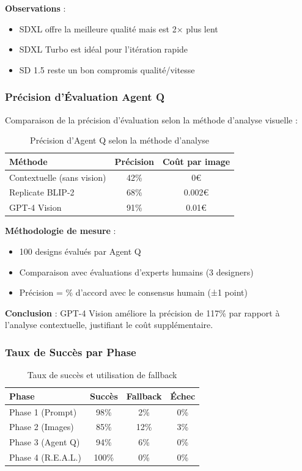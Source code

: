 \textbf{Observations} :
\begin{itemize}[leftmargin=*]
    \item SDXL offre la meilleure qualité mais est 2× plus lent
    \item SDXL Turbo est idéal pour l'itération rapide
    \item SD 1.5 reste un bon compromis qualité/vitesse
\end{itemize}

\subsubsection{Précision d'Évaluation Agent Q}

Comparaison de la précision d'évaluation selon la méthode d'analyse visuelle :

\begin{table}[H]
\centering
\caption{Précision d'Agent Q selon la méthode d'analyse}
\label{tab:agent_q_accuracy}
\begin{tabular}{@{}lcc@{}}
\toprule
\textbf{Méthode} & \textbf{Précision} & \textbf{Coût par image} \\ 
\midrule
Contextuelle (sans vision) & 42\% & 0€ \\
Replicate BLIP-2 & 68\% & 0.002€ \\
GPT-4 Vision & 91\% & 0.01€ \\
\bottomrule
\end{tabular}
\end{table}

\textbf{Méthodologie de mesure} :
\begin{itemize}[leftmargin=*]
    \item 100 designs évalués par Agent Q
    \item Comparaison avec évaluations d'experts humains (3 designers)
    \item Précision = \% d'accord avec le consensus humain (±1 point)
\end{itemize}

\textbf{Conclusion} : GPT-4 Vision améliore la précision de 117\% par rapport à l'analyse contextuelle, justifiant le coût supplémentaire.

\subsubsection{Taux de Succès par Phase}

\begin{table}[H]
\centering
\caption{Taux de succès et utilisation de fallback}
\label{tab:success_rates}
\begin{tabular}{@{}lccc@{}}
\toprule
\textbf{Phase} & \textbf{Succès} & \textbf{Fallback} & \textbf{Échec} \\ 
\midrule
Phase 1 (Prompt) & 98\% & 2\% & 0\% \\
Phase 2 (Images) & 85\% & 12\% & 3\% \\
Phase 3 (Agent Q) & 94\% & 6\% & 0\% \\
Phase 4 (R.E.A.L.) & 100\% & 0\% & 0\% \\
\bottomrule
\end{tabular}
\end{table}

